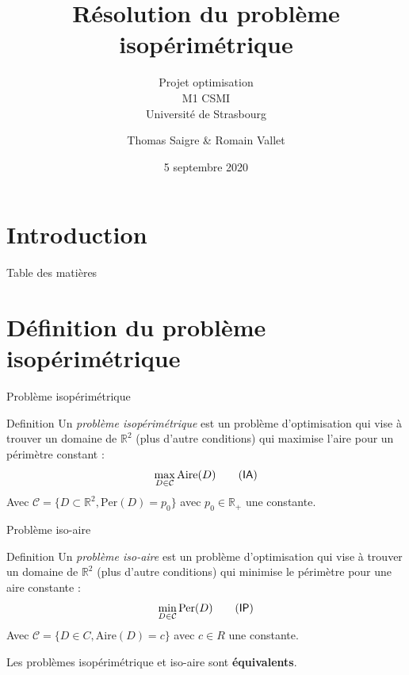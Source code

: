 \documentclass[11pt,envcountsect,aspectratio=169]{beamer} %
\author[Thomas S. \& Romain V.]{Thomas Saigre \& Romain Vallet}
\title{Résolution du problème isopérimétrique}
\subtitle{Projet optimisation \\ M1 CSMI \\ Université de Strasbourg}
\date{5 septembre 2020}  %
\newcommand{\frametitre}{\begin{frame}
	\begin{center}
	{\Large\bf \secname}
	\end{center}
	\end{frame}
}
\newcommand{\R}{\mathbb{R}}
\newcommand{\C}{\mathcal{C}}
\newcommand{\A}{\mathrm{Aire}}
\newcommand{\p}{\mathrm{Per}}
\newcommand{\IA}{\textsf{IA}}
\newcommand{\IP}{\textsf{IP}}
\begin{document}
\begin{frame}[plain]
\titlepage
\end{frame}


\section[Introduction]{Introduction}




\begin{frame}{Table des matières}
\tableofcontents[hideallsubsections]
\end{frame}




\section{Définition du problème isopérimétrique}

\begin{frame}{Problème isopérimétrique}

\begin{beamerboxesrounded}[upper=titreB,lower=texteB,shadow=true]{Definition}
		Un \emph{problème isopérimétrique} est un problème d'optimisation qui vise à trouver un domaine de $\R^2$ (plus d'autre conditions) qui maximise l'aire pour un périmètre constant :
        \[\max_{D \in \C} \A(D) \label{ia}\tag{\IA}\]
        Avec $\mathcal{C} = \{ D \subset\R^2, \p(D) = p_0 \}$ avec $p_0\in \R_+$ une constante.
\end{beamerboxesrounded}

\end{frame}

\begin{frame}{Problème iso-aire}

\begin{beamerboxesrounded}[upper=titreB,lower=texteB,shadow=true]{Definition}
		Un \emph{problème iso-aire} est un problème d'optimisation qui vise à trouver un domaine de $\R^2$ (plus d'autre conditions) qui minimise le périmètre pour une aire constante :
        \[\min_{D \in \C} \p(D) \label{ip}\tag{\IP}\]
        Avec $\mathcal{C} = \{ D \in C, \A(D)=c \}$ avec $c \in R$ une constante.
\end{beamerboxesrounded}

Les problèmes isopérimétrique et iso-aire sont \textbf{équivalents}.

\end{frame}
\end{document}

